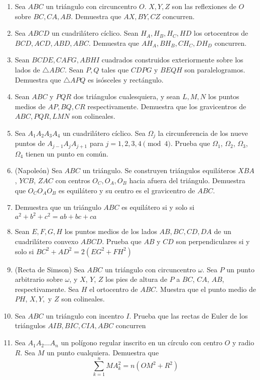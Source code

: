 \documentclass[11pt]{scrartcl}
\begin{document}
\begin{enumerate}
    \item Sea $ABC$ un triángulo con circuncentro $O$. $X, Y, Z$ son las reflexiones de $O$ sobre $BC, CA, AB$. Demuestra que $AX, BY, CZ$ concurren.
    \item Sea $ABCD$ un cuadrilátero cíclico. Sean $H_A, H_B, H_C, HD$ los ortocentros de $BCD, ACD, ABD, ABC$. Demuestra que $AH_A, BH_B, CH_C, DH_D$ concurren.
    \item  Sean $BCDE, CAFG, ABHI$ cuadrados construidos exteriormente sobre los lados de $\triangle ABC$. Sean $P, Q$ tales que $CDPG$ y $BEQH$ son paralelogramos. Demuestra que $\triangle APQ$ es isósceles y rectángulo.
    \item Sean $ABC$ y $PQR$ dos triángulos cualesquiera, y sean $L, M, N$ los puntos medios de $AP, BQ, CR$ respectivamente. Demuestra que los gravicentros de $ABC, PQR, LMN$ son colineales. 
    \item Sea $A_1A_2A_3A_4$ un cuadrilátero cíclico. Sea $\Omega_j$ la circunferencia de los nueve puntos de $A_{j-1}A_jA_{j+1}$ para $j=1, 2, 3, 4 \pmod 4$. Prueba que $\Omega_1$, $\Omega_2$, $\Omega_3$, $\Omega_4$ tienen un punto en común.
    \item (Napoleón) Sea $ABC$ un triángulo. Se construyen triángulos equiláteros $XBA$, $YCB$, $ZAC$ con centros $O_C, O_A, O_B$ hacia afuera del triángulo. Demuestra que $O_CO_AO_B$ es equilátero y su centro es el gravicentro de $ABC$.
    \item Demuestra que un triángulo $ABC$ es equilátero si y solo si $a^2+b^2+c^2=ab+bc+ca$
    \item Sean $E, F, G, H$ los puntos medios de los lados $AB, BC, CD, DA$ de un cuadrilátero convexo $ABCD$. Prueba que $AB$ y $CD$ son perpendiculares si y solo si $BC^2+AD^2=2(EG^2+FH^2)$
   \item (Recta de Simson) Sea $ABC$ un triángulo con circuncentro $\omega$. Sea $P$ un punto arbitrario sobre $\omega$, y $X$, $Y$, $Z$ los pies de altura de $P$ a $BC$, $CA$, $AB$, respectivamente.
   Sea $H$ el ortocentro de $ABC$. Muestra que el punto medio de $PH$, $X, Y,$ y $Z$ son colineales.
   \item Sea $ABC$ un triángulo con incentro $I$. Prueba que las rectas de Euler de los triángulos $AIB, BIC, CIA, ABC$ concurren
   \item Sea $A_1A_2 \dots A_n$ un polígono regular inscrito en un círculo con centro $O$ y radio $R$. Sea $M$ un punto cualquiera. Demuestra que $$\sum_{k=1}^n MA^2_k=n(OM^2+R^2)$$

\end{enumerate}
\end{document}
